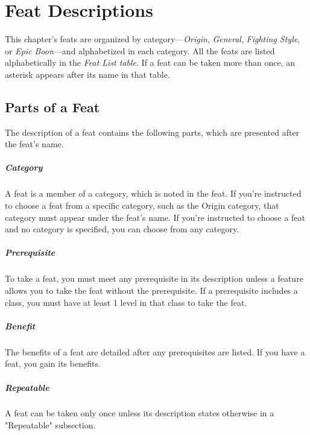 \documentclass[10pt,a4paper,twoside,bg=print,twocolumn,openany,nodeprecatedcode]{dndbook}
\begin{document}
\section{Feat Descriptions}
This chapter's feats are organized by category—\textit{Origin}, \textit{General}, \textit{Fighting Style}, or \textit{Epic Boon}—and alphabetized in each category. All the feats are listed alphabetically in the \textit{Feat List table}. If a feat can be taken more than once, an asterisk appears after its name in that table.

\subsection{Parts of a Feat}
The description of a feat contains the following parts, which are presented after the feat's name.

\subparagraph{Category}
A feat is a member of a category, which is noted in the feat. If you're instructed to choose a feat from a specific category, such as the Origin category, that category must appear under the feat's name. If you're instructed to choose a feat and no category is specified, you can choose from any category.

\subparagraph{Prerequisite}
To take a feat, you must meet any prerequisite in its description unless a feature allows you to take the feat without the prerequisite. If a prerequisite includes a class, you must have at least 1 level in that class to take the feat.

\subparagraph{Benefit}
The benefits of a feat are detailed after any prerequisites are listed. If you have a feat, you gain its benefits.

\subparagraph{Repeatable}
A feat can be taken only once unless its description states otherwise in a "Repeatable" subsection.
\end{document}
